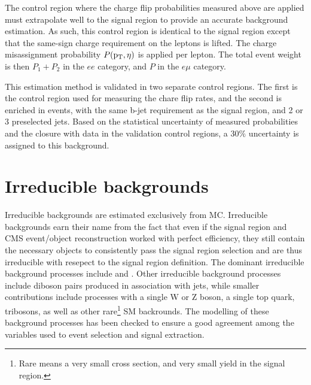 The control region where the charge flip probabilities measured above are applied must extrapolate well to the signal region to provide an accurate background estimation. As such, this control region
is identical to the signal region except that the same-sign charge requirement on the leptons is lifted.
The charge misassignment probability $P(\mathrm{p}_{\mathrm{T}},\eta)$ is applied per lepton. The total event weight is then $P_{1} + P_{2}$ in the $ee$ category, and $P$ in the $e\mu$ category.  

This estimation method is validated in two separate control regions. The first is the control region used for measuring the chare flip rates, and the second is enriched in \ttbar events, with the same b-jet
requirement as the signal region, and 2 or 3 preselected jets. Based on the statistical uncertainty of measured probabilities and the closure with data in the validation control regions, a 30$\%$ uncertainty
is assigned to this background. 

\section{Irreducible backgrounds}
Irreducible backgrounds are estimated exclusively from MC. Irreducible backgrounds earn their name from the fact that even if the signal region and CMS event/object reconstruction
worked with perfect efficiency, they still contain the necessary objects to consistently pass the signal region selection and are thus irreducible with resepect to the signal
region definition. The dominant irreducible background processes include \ttw and \ttz. Other irreducible background processes include diboson pairs produced in association with jets,
while smaller contributions include processes with a single W or Z boson, a single top quark, tribosons, as well as other rare\footnote{Rare means a very small cross section, and very
small yield in the signal region.} SM backrounds. The modelling of these background processes has been checked to ensure a good agreement among the variables used to event selection and
signal extraction.  

